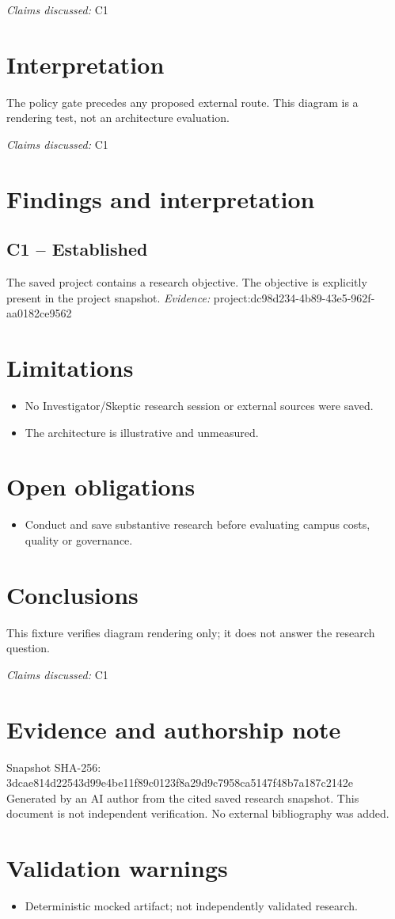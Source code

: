 \documentclass[11pt]{article}
\begin{document}
\textit{Claims discussed: }C1
\section{Interpretation}
The policy gate precedes any proposed external route. This diagram is a rendering test, not an architecture evaluation.

\textit{Claims discussed: }C1
\section{Findings and interpretation}
\subsection{C1 -- Established}
The saved project contains a research objective.
The objective is explicitly present in the project snapshot.
\textit{Evidence: }project:dc98d234-4b89-43e5-962f-aa0182ce9562
\section{Limitations}
\begin{itemize}
\item No Investigator/Skeptic research session or external sources were saved.
\item The architecture is illustrative and unmeasured.
\end{itemize}
\section{Open obligations}
\begin{itemize}
\item Conduct and save substantive research before evaluating campus costs, quality or governance.
\end{itemize}
\section{Conclusions}
This fixture verifies diagram rendering only; it does not answer the research question.

\textit{Claims discussed: }C1
\section*{Evidence and authorship note}
Snapshot SHA-256: 3dcae814d22543d99e4be11f89c0123f8a29d9c7958ca5147f48b7a187c2142e
Generated by an AI author from the cited saved research snapshot. This document is not independent verification. No external bibliography was added.
\section*{Validation warnings}
\begin{itemize}
\item Deterministic mocked artifact; not independently validated research.
\end{itemize}
\end{document}
